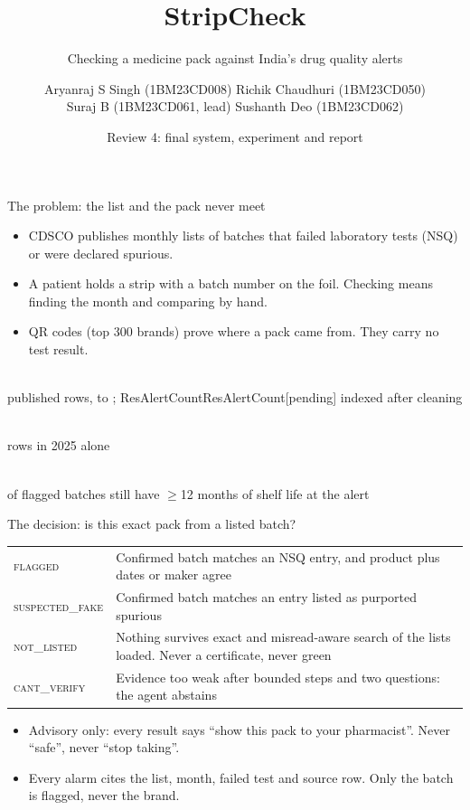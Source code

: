 \documentclass[aspectratio=169,11pt]{beamer}
\title{StripCheck}
\subtitle{Checking a medicine pack against India's drug quality alerts}
\author{\small Aryanraj S Singh (1BM23CD008) \quad Richik Chaudhuri (1BM23CD050)\\ Suraj B (1BM23CD061, lead) \quad Sushanth Deo (1BM23CD062)}
\institute{\scriptsize B.E.\ CSE (Data Science), Semester VII, BMS College of Engineering\\Agentic AI (26CD7PEAAI) \textperiodcentered{} Instructor: Dr.\ Kalyan Nagaraj}
\date{Review 4: final system, experiment and report}
\newcommand{\res}[1]{\ifcsname #1\endcsname\csname #1\endcsname\else\textcolor{brick}{[pending]}\fi}
\newcommand{\V}[1]{\textsc{\lowercase{#1}}}
\newcommand{\bignum}[2]{\begin{minipage}[t]{0.3\textwidth}\centering{\fontsize{20}{22}\selectfont\color{teal}\textbf{#1}}\\[2pt]{\small\color{muted}#2}\end{minipage}}
\begin{document}
\maketitle

\begin{frame}{The problem: the list and the pack never meet}
\small
\begin{itemize}
\item CDSCO publishes monthly lists of batches that failed laboratory tests (NSQ) or were declared spurious.
\item A patient holds a strip with a batch number on the foil. Checking means finding the month and comparing by hand.
\item QR codes (top 300 brands) prove where a pack came from. They carry no test result.
\end{itemize}
\vfill
\begin{center}
\bignum{\NumAlertRows}{published rows, \FirstMonth{} to \LastMonth; \res{ResAlertCount} indexed after cleaning}\hfill
\bignum{\RowsYearTwentyFive}{rows in 2025 alone}\hfill
\bignum{\ShelfTwelvePlusPct\%}{of flagged batches still have $\geq$12 months of shelf life at the alert}
\end{center}
\vfill
\end{frame}

\begin{frame}{The decision: is this exact pack from a listed batch?}
\begin{center}
\footnotesize
\renewcommand{\arraystretch}{1.3}\begin{tabularx}{0.92\textwidth}{@{}l X@{}}
\toprule
\textcolor{brick}{\V{FLAGGED}} & Confirmed batch matches an NSQ entry, and product plus dates or maker agree \\
\textcolor{brick}{\V{SUSPECTED\_FAKE}} & Confirmed batch matches an entry listed as purported spurious \\
\V{NOT\_LISTED} & Nothing survives exact and misread-aware search of the lists loaded. Never a certificate, never green \\
\textcolor{muted}{\V{CANT\_VERIFY}} & Evidence too weak after bounded steps and two questions: the agent abstains \\
\bottomrule
\end{tabularx}
\end{center}
\vspace{1mm}
\footnotesize
\begin{itemize}
\item Advisory only: every result says ``show this pack to your pharmacist''. Never ``safe'', never ``stop taking''.
\item Every alarm cites the list, month, failed test and source row. Only the batch is flagged, never the brand.
\end{itemize}
\end{frame}
\end{document}
